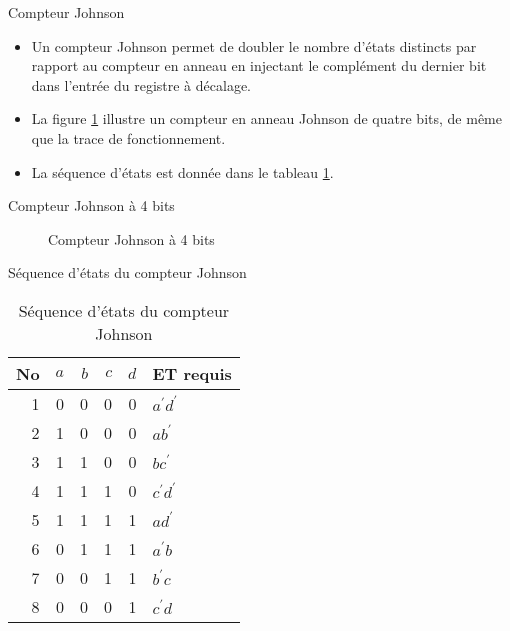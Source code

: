 \documentclass[presentation]{beamer}
\begin{document}
\begin{frame}[label={sec:org6c6ab94}]{Compteur Johnson}
\begin{itemize}
\item Un compteur Johnson permet de doubler le nombre d'états distincts par rapport au compteur en anneau en injectant le complément du dernier bit dans l'entrée du registre à décalage.

\item La figure \ref{fig:org0eadf62} illustre un compteur en anneau Johnson de quatre bits, de même que la trace de fonctionnement.

\item La séquence d'états est donnée dans le tableau \ref{tab:org50184bc}.
\end{itemize}
\end{frame}

\begin{frame}[label={sec:orgc2eddaf}]{Compteur Johnson à 4 bits}
\begin{figure}[htbp]
\centering

\caption{\label{fig:org0eadf62}Compteur Johnson à 4 bits}
\end{figure}
\end{frame}

\begin{frame}[label={sec:org4ef1df7}]{Séquence d'états du compteur Johnson}
\begin{table}[htbp]
\caption{\label{tab:org50184bc}Séquence d'états du compteur Johnson}
\centering
\begin{tabular}{rrrrrl}
No & \(a\) & \(b\) & \(c\) & \(d\) & ET requis\\[0pt]
\hline
1 & 0 & 0 & 0 & 0 & \(a^\prime d^\prime\)\\[0pt]
2 & 1 & 0 & 0 & 0 & \(a b^\prime\)\\[0pt]
3 & 1 & 1 & 0 & 0 & \(b c^\prime\)\\[0pt]
4 & 1 & 1 & 1 & 0 & \(c^\prime d^\prime\)\\[0pt]
5 & 1 & 1 & 1 & 1 & \(a d^\prime\)\\[0pt]
6 & 0 & 1 & 1 & 1 & \(a^\prime b\)\\[0pt]
7 & 0 & 0 & 1 & 1 & \(b^\prime c\)\\[0pt]
8 & 0 & 0 & 0 & 1 & \(c^\prime d\)\\[0pt]
\end{tabular}
\end{table}
\end{frame}
\end{document}
